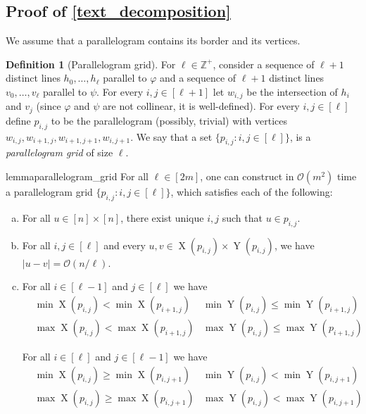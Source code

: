 \documentclass[11pt, letterpaper]{article}
\theoremstyle{plain}
\theoremstyle{definition}
\newtheorem{definition}{Definition}
\theoremstyle{remark}
\newcommand{\Z}{\mathbb{Z}}
\renewcommand{\O}{\mathcal{O}}
\renewcommand{\phi}{\varphi}
\newcommand{\eq}[1]{\begin{align*} #1 \end{align*}}
\DeclareMathOperator*{\X}{X}
\DeclareMathOperator*{\Y}{Y}
\newcommand{\absolute}[1]{\left\lvert#1\right\rvert}
\begin{document}
\TextDecomposition


\subsection{Proof of \cref{text_decomposition}}
We assume that a parallelogram contains its border and its vertices.

\begin{definition}[Parallelogram grid]
	For $\ell \in \Z^+$, consider a sequence of $\ell+1$  distinct lines $h_0, \dots, h_\ell$ parallel to $\phi$ and a sequence of $\ell+1$ distinct lines $v_0, \dots, v_\ell$ parallel to $\psi$.
	For every $i, j \in [\ell + 1]$ let $w_{i, j}$ be the intersection of $h_i$ and $v_j$ (since $\phi$ and $\psi$ are not collinear, it is well-defined).
	For every $i, j \in [\ell]$ define $p_{i, j}$ to be the parallelogram (possibly, trivial) with vertices $w_{i, j}, w_{i + 1, j}, w_{i + 1, j + 1}, w_{i, j + 1}$. We say that a set $\{p_{i,j} : i,j \in [\ell]\}$, is a \emph{parallelogram grid} of size $\ell$. 
\end{definition}

\begin{restatable}{lemma}{parallelogram_grid}\label{lm:parallelogram_grid}
For all $\ell \in [2m]$, one can construct in $\O(m^2)$ time a parallelogram grid $\{p_{i,j} : i,j \in [\ell]\}$, which satisfies each of the following:
\begin{enumerate}[(a)]
\item \label{it:unique} For all $u \in [n] \times [n]$, there exist unique $i,j$ such that $u \in p_{i,j}$.

\item \label{it:small_parallelogram} For all $i, j \in [\ell]$ and every $u, v \in \X(p_{i, j}) \times \Y(p_{i, j})$, we have $\absolute{u - v} = \O(n / \ell)$.

\item \label{it:monotonicity} For all $i \in [\ell - 1]$ and $j \in [\ell]$ we have
	\eq{
	&\min \X(p_{i, j}) < \min \X(p_{i + 1, j}) &\min \Y(p_{i, j}) \le \min \Y(p_{i + 1, j}) \\
	&\max \X(p_{i, j}) < \max \X(p_{i + 1, j})  &\max \Y(p_{i, j}) \le \max \Y(p_{i + 1, j})
	}
	
For all $i \in [\ell]$ and $j \in [\ell - 1]$ we have
	\eq{
		&\min \X(p_{i, j}) \ge \min \X(p_{i, j + 1})  &\min \Y(p_{i, j}) < \min \Y(p_{i, j + 1}) \\
		&\max \X(p_{i, j}) \ge \max \X(p_{i, j + 1})  &\max \Y(p_{i, j}) < \max \Y(p_{i, j + 1})
	}
\end{enumerate}
\end{restatable}
\end{document}
